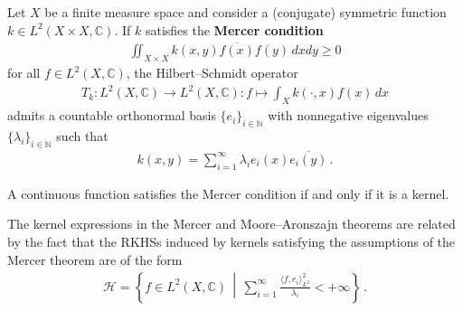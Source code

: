     \begin{theorem}[Mercer]
        Let $X$ be a finite measure space and consider a (conjugate) symmetric function $k\in L^2(X\times X,\mathbb{C})$. If $k$ satisfies the \textbf{Mercer condition}
        \begin{gather}
            \iint_{X\times X}k(x,y)\overline{f(x)}f(y)\,dxdy\geq0
        \end{gather}
        for all $f\in L^2(X,\mathbb{C})$, the Hilbert--Schmidt operator
        \begin{gather}
            T_k:L^2(X,\mathbb{C})\rightarrow L^2(X,\mathbb{C}):f\mapsto\int_Xk(\cdot,x)f(x)\,dx
        \end{gather}
        admits a countable orthonormal basis $\{e_i\}_{i\in\mathbb{N}}$ with nonnegative eigenvalues $\{\lambda_i\}_{i\in\mathbb{N}}$ such that
        \begin{gather}
            k(x,y) = \sum_{i=1}^\infty\lambda_ie_i(x)\overline{e_i(y)}\,.
        \end{gather}
    \end{theorem}
    \begin{theorem}[Bochner]
        A continuous function satisfies the Mercer condition if and only if it is a kernel.
    \end{theorem}


    \begin{remark}
        The kernel expressions in the Mercer and Moore--Aronszajn theorems are related by the fact that the RKHSs induced by kernels satisfying the assumptions of the Mercer theorem are of the form
        \begin{gather}
            \mathcal{H} = \left\{f\in L^2(X,\mathbb{C})\,\middle\vert\,\sum_{i=1}^\infty\frac{\langle f,e_i \rangle^2_{L^2}}{\lambda_i}<+\infty\right\}\,.
        \end{gather}
    \end{remark}

